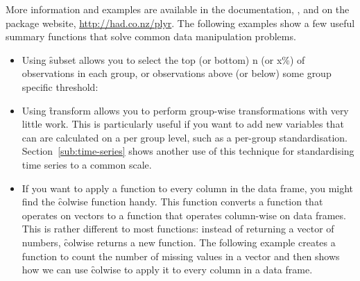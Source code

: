 More information and examples are available in the documentation, , and on the package website, \url{http://had.co.nz/plyr}.  The following examples show a few useful summary functions that solve common data manipulation problems.

\begin{itemize}
  \item Using \f{subset} allows you to select the top (or bottom) n (or x\%) of observations in each group, or observations above (or below) some group specific threshold:
  
    
  
  \item Using \f{transform} allows you to perform group-wise transformations with very little work.  This is particularly useful if you want to add new variables that can are calculated on a per group level, such as a per-group standardisation.  Section~\ref{sub:time-series} shows another use of this technique for standardising time series to a common scale.
  
    

  \item If you want to apply a function to every column in the data frame, you might find the \f{colwise} function handy. This function converts a function that operates on vectors to a function that operates column-wise on data frames. This is rather different to most functions: instead of returning a vector of numbers, \f{colwise} returns a new function. The following example creates a function to count the number of missing values in a vector and then shows how we can use \f{colwise} to apply it to every column in a data frame.

  

\end{itemize}
